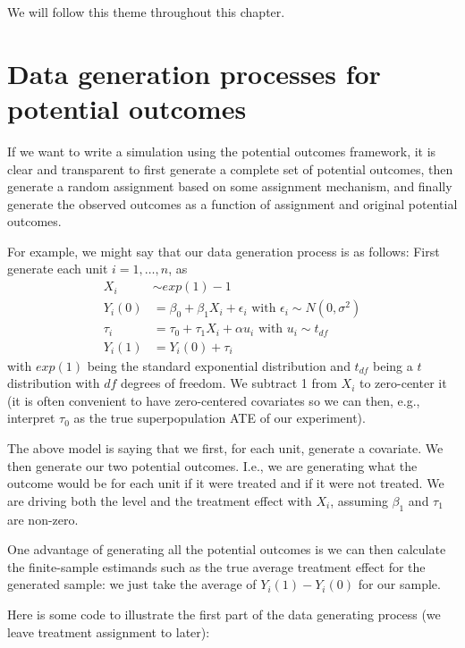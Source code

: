 \documentclass[
]{book}
\begin{document}
We will follow this theme throughout this chapter.

\hypertarget{data-generation-processes-for-potential-outcomes}{%
\section{Data generation processes for potential outcomes}\label{data-generation-processes-for-potential-outcomes}}

If we want to write a simulation using the potential outcomes framework, it is clear and transparent to first generate a complete set of potential outcomes, then generate a random assignment based on some assignment mechanism, and finally generate the observed outcomes as a function of assignment and original potential outcomes.

For example, we might say that our data generation process is as follows: First generate each unit \(i = 1, \ldots, n\), as
\[
\begin{aligned}
X_i &\sim exp( 1 ) - 1 \\
Y_i(0) &= \beta_0 + \beta_1 X_i + \epsilon_i \mbox{ with } \epsilon_i \sim N( 0, \sigma^2 ) \\
\tau_i &= \tau_0 + \tau_1 X_i + \alpha u_i \mbox{ with } u_i \sim t_{df} \\
Y_i(1) &= Y_i(0) + \tau_i 
\end{aligned}
\]
with \(exp(1)\) being the standard exponential distribution and \(t_{df}\) being a \(t\) distribution with \(df\) degrees of freedom.
We subtract 1 from \(X_i\) to zero-center it (it is often convenient to have zero-centered covariates so we can then, e.g., interpret \(\tau_0\) as the true superpopulation ATE of our experiment).

The above model is saying that we first, for each unit, generate a covariate.
We then generate our two potential outcomes.
I.e., we are generating what the outcome would be for each unit if it were treated and if it were not treated.
We are driving both the level and the treatment effect with \(X_i\), assuming \(\beta_1\) and \(\tau_1\) are non-zero.

One advantage of generating all the potential outcomes is we can then calculate the finite-sample estimands such as the true average treatment effect for the generated sample: we just take the average of \(Y_i(1) - Y_i(0)\) for our sample.

Here is some code to illustrate the first part of the data generating process (we leave treatment assignment to later):
\end{document}
